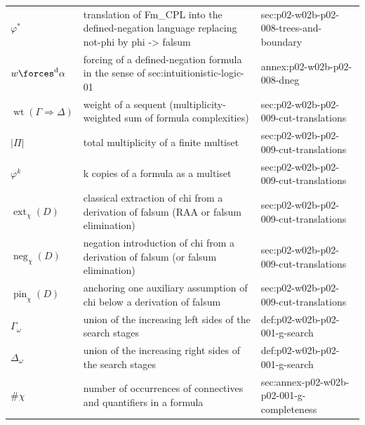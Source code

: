 \begin{longtable}{@{}p{}p{}p{}@{}}
\(\varphi^{\ast}\) & translation of Fm\_CPL into the defined-negation language replacing not-phi by phi -> falsum & sec:\allowbreak{}p02-\allowbreak{}w02b-\allowbreak{}p02-\allowbreak{}008-\allowbreak{}trees-\allowbreak{}and-\allowbreak{}boundary \\
\(w\forces^{\mathrm d}\alpha\) & forcing of a defined-negation formula in the sense of sec:intuitionistic-logic-01 & annex:\allowbreak{}p02-\allowbreak{}w02b-\allowbreak{}p02-\allowbreak{}008-\allowbreak{}dneg \\
\(\operatorname{wt}(\Gamma\Rightarrow\Delta)\) & weight of a sequent (multiplicity-weighted sum of formula complexities) & sec:\allowbreak{}p02-\allowbreak{}w02b-\allowbreak{}p02-\allowbreak{}009-\allowbreak{}cut-\allowbreak{}translations \\
\(|\Pi|\) & total multiplicity of a finite multiset & sec:\allowbreak{}p02-\allowbreak{}w02b-\allowbreak{}p02-\allowbreak{}009-\allowbreak{}cut-\allowbreak{}translations \\
\(\varphi^{k}\) & k copies of a formula as a multiset & sec:\allowbreak{}p02-\allowbreak{}w02b-\allowbreak{}p02-\allowbreak{}009-\allowbreak{}cut-\allowbreak{}translations \\
\(\operatorname{ext}_\chi(D)\) & classical extraction of chi from a derivation of falsum (RAA or falsum elimination) & sec:\allowbreak{}p02-\allowbreak{}w02b-\allowbreak{}p02-\allowbreak{}009-\allowbreak{}cut-\allowbreak{}translations \\
\(\operatorname{neg}_\chi(D)\) & negation introduction of chi from a derivation of falsum (or falsum elimination) & sec:\allowbreak{}p02-\allowbreak{}w02b-\allowbreak{}p02-\allowbreak{}009-\allowbreak{}cut-\allowbreak{}translations \\
\(\operatorname{pin}_\chi(D)\) & anchoring one auxiliary assumption of chi below a derivation of falsum & sec:\allowbreak{}p02-\allowbreak{}w02b-\allowbreak{}p02-\allowbreak{}009-\allowbreak{}cut-\allowbreak{}translations \\
\(\Gamma_\omega\) & union of the increasing left sides of the search stages & def:\allowbreak{}p02-\allowbreak{}w02b-\allowbreak{}p02-\allowbreak{}001-\allowbreak{}g-\allowbreak{}search \\
\(\Delta_\omega\) & union of the increasing right sides of the search stages & def:\allowbreak{}p02-\allowbreak{}w02b-\allowbreak{}p02-\allowbreak{}001-\allowbreak{}g-\allowbreak{}search \\
\(\#\chi\) & number of occurrences of connectives and quantifiers in a formula & sec:\allowbreak{}annex-\allowbreak{}p02-\allowbreak{}w02b-\allowbreak{}p02-\allowbreak{}001-\allowbreak{}g-\allowbreak{}completeness \\

\end{longtable}

